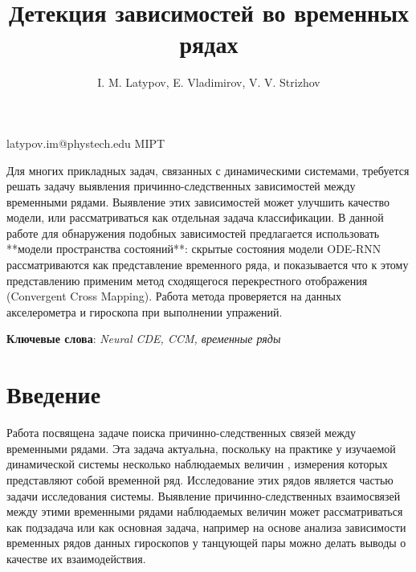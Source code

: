 \documentclass[12pt, twoside]{article}
\begin{document}
\title
	[Детекция зависимостей во временных рядах]
	{Детекция зависимостей во временных рядах}
\author
	[I. M. Latypov]
	{I. M. Latypov, E. Vladimirov, V. V. Strizhov}
\email
	{latypov.im@phystech.edu}
\organization	
	{MIPT}	
\abstract
	{
		Для многих прикладных задач, связанных с динамическими системами, требуется решать задачу выявления причинно-следственных зависимостей между временными рядами. 
		Выявление этих зависимостей может улучшить качество модели, или рассматриваться как отдельная задача классификации. 
		В данной работе для обнаружения подобных зависимостей предлагается использовать **модели пространства состояний**: скрытые состояния модели ODE-RNN рассматриваются 
		как представление временного ряда, и показывается что к этому представлению применим метод сходящегося перекрестного отображения (Convergent Cross Mapping).
		Работа метода проверяется на данных акселерометра и гироскопа при выполнении упражений.
		
		}
\bigskip
\noindent

\maketitle
\textbf{Ключевые слова}: \emph{Neural CDE, CCM, временные ряды}

\section{Введение}
		Работа посвящена задаче поиска причинно-следственных связей между временными рядами. Эта задача актуальна, поскольку на практике у изучаемой динамической системы несколько наблюдаемых величин \cite{dataset_mlru}, измерения которых представляют собой временной ряд. Исследование этих рядов является частью задачи исследования системы. Выявление причинно-следственных взаимосвязей между этими временными рядами наблюдаемых величин может рассматриваться как подзадача или как основная задача, например на основе анализа зависимости временных рядов данных гироскопов у танцующей пары можно делать выводы о качестве их взаимодействия.
		
		
\end{document}
